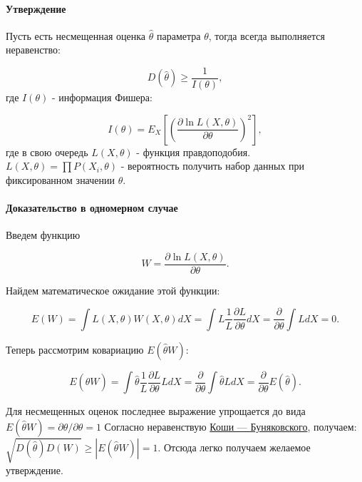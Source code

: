 \paragraph{Утверждение}

Пусть есть несмещенная оценка $\hat\theta$ параметра $\theta$, тогда
всегда выполняется неравенство:

\begin{equation}
  D(\hat\theta) \geq \frac{1}{I(\theta)},
\end{equation} где $I(\theta)$ - информация Фишера:

\begin{equation}
  I(\theta) = E_X \left[\left( \frac{\partial \ln L(X,\theta)}{\partial \theta} \right)^2 \right],
\end{equation} где в свою очередь $L(X, \theta)$ - функция
правдоподобия. $L(X,\theta) = \prod{P(X_i,\theta)}$ - вероятность
получить набор данных при фиксированном значении $\theta$.

\paragraph{Доказательство в одномерном случае}

Введем функцию

\begin{equation}
  W = \frac{\partial \ln L(X,\theta)} {\partial \theta}.
\end{equation}

Найдем математическое ожидание этой функции:

\begin{equation}
  E(W) = \int{L(X, \theta) W(X, \theta) dX} = \int{ L \frac{1}{L} \frac{\partial L}{\partial \theta} dX} = \frac{\partial}{\partial \theta} \int{L dX} = 0.
\end{equation}

Теперь рассмотрим ковариацию $E(\hat\theta W)$:

\begin{equation}
  E(\hat\theta W) = \int{\hat\theta \frac{1}{L} \frac{\partial L} {\partial {\theta}} L dX} = \frac{\partial}{\partial \theta} \int{\hat\theta L dX} =  \frac{\partial}{\partial \theta} E(\hat\theta).
\end{equation}

Для несмещенных оценок последнее выражение упрощается до вида
$E(\hat\theta W) = {\partial \theta}/{\partial \theta} = 1$ Согласно
неравенствую
\href{https://ru.wikipedia.org/wiki/\%D0\%9D\%D0\%B5\%D1\%80\%D0\%B0\%D0\%B2\%D0\%B5\%D0\%BD\%D1\%81\%D1\%82\%D0\%B2\%D0\%BE_\%D0\%9A\%D0\%BE\%D1\%88\%D0\%B8_\%E2\%80\%94_\%D0\%91\%D1\%83\%D0\%BD\%D1\%8F\%D0\%BA\%D0\%BE\%D0\%B2\%D1\%81\%D0\%BA\%D0\%BE\%D0\%B3\%D0\%BE}{Коши
--- Буняковского}, получаем:
$\sqrt{D(\hat\theta) D(W)} \geq \left| E(\hat\theta W) \right| = 1$.
Отсюда легко получаем желаемое утверждение.

